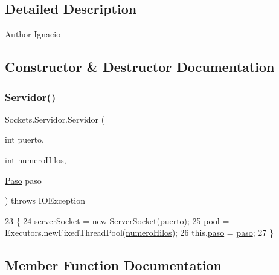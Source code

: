 \subsection{Detailed Description}
\begin{DoxyAuthor}{Author}
Ignacio 
\end{DoxyAuthor}


\subsection{Constructor \& Destructor Documentation}
\mbox{\label{class_sockets_1_1_servidor_a96cc7a6530e585d256ba5c381e04b3a6}} 
\subsubsection{\texorpdfstring{Servidor()}{Servidor()}}
{\footnotesize\ttfamily Sockets.\+Servidor.\+Servidor (\begin{DoxyParamCaption}\item[{int}]{puerto,  }\item[{int}]{numero\+Hilos,  }\item[{\mbox{\hyperlink{class_sockets_1_1_paso}{Paso}}}]{paso }\end{DoxyParamCaption}) throws I\+O\+Exception\hspace{0.3cm}{\ttfamily [inline]}}


\begin{DoxyCode}
23                                                                                \{
24       \mbox{\hyperlink{class_sockets_1_1_servidor_aa6eba116bcc543fa6b532894a6402957}{serverSocket}} = \textcolor{keyword}{new} ServerSocket(puerto);
25       \mbox{\hyperlink{class_sockets_1_1_servidor_a1a2e8bae5883a358083c35093a2a74b3}{pool}} = Executors.newFixedThreadPool(\mbox{\hyperlink{class_sockets_1_1_servidor_a691693d40a5185891964aea68f2e01c7}{numeroHilos}});
26       this.\mbox{\hyperlink{class_sockets_1_1_servidor_ae795e6902937973b50d977b2ed77b470}{paso}} = \mbox{\hyperlink{class_sockets_1_1_servidor_ae795e6902937973b50d977b2ed77b470}{paso}};
27     \}
\end{DoxyCode}


\subsection{Member Function Documentation}
\mbox{\label{class_sockets_1_1_servidor_abd6e00143db2f9368f53083c427ad2b4}} 
